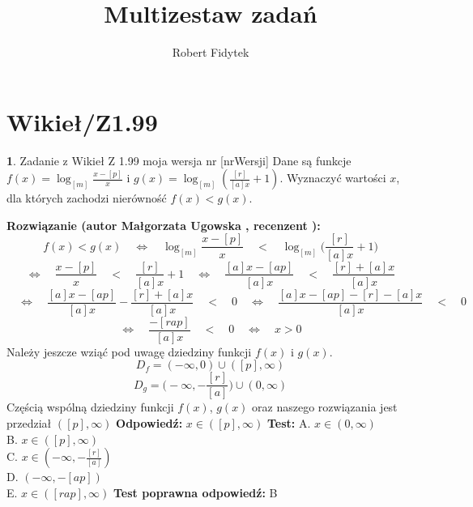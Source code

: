 \documentclass[12pt, a4paper]{article}
\title{Multizestaw zadań}
\author{Robert Fidytek}
\date{}
\theoremstyle{definition} %
\newtheorem{zad}{}
\newcommand{\kategoria}[1]{\section{#1}} %
\newcommand{\zadStart}[1]{\begin{zad}#1\newline} %
\newcommand{\zadStop}{\end{zad}}   %
\newcommand{\rozwStart}[2]{\noindent \textbf{Rozwiązanie (autor #1 , recenzent #2): }\newline} %
\newcommand{\rozwStop}{\newline}                                            %
\newcommand{\odpStart}{\noindent \textbf{Odpowiedź:}\newline}    %
\newcommand{\odpStop}{\newline}                                             %
\newcommand{\testStart}{\noindent \textbf{Test:}\newline} %
\newcommand{\testStop}{\newline} %
\newcommand{\kluczStart}{\noindent \textbf{Test poprawna odpowiedź:}\newline} %
\newcommand{\kluczStop}{\newline} %
\begin{document}
\maketitle


\kategoria{Wikieł/Z1.99}
\zadStart{Zadanie z Wikieł Z 1.99 moja wersja nr [nrWersji]}
Dane są funkcje $f(x) = \log_{[m]}{\frac{x-[p]}{x}}$ i $g(x)= \log_{[m]}{(\frac{[r]}{[a] x}+1)}$. Wyznaczyć warto\'sci $x$, dla których zachodzi nierówno\'sć $f(x)<g(x).$
\zadStop
\rozwStart{Małgorzata Ugowska}{}
$$f(x)<g(x) \quad \Longleftrightarrow \quad \log_{[m]}{\frac{x-[p]}{x}} \quad < \quad \log_{[m]}{\Big(\frac{[r]}{[a] x}+1\Big)}$$
$$ \Longleftrightarrow \quad \frac{x-[p]}{x} \quad < \quad \frac{[r]}{[a] x}+1 \quad \Longleftrightarrow \quad  \frac{[a]x-[ap]}{[a]x} \quad < \quad \frac{[r]+[a]x}{[a] x} $$
$$\quad \Longleftrightarrow \quad  \frac{[a]x-[ap]}{[a]x} - \frac{[r]+[a]x}{[a] x} \quad < \quad 0 \quad \Longleftrightarrow \quad  \frac{[a]x-[ap]-[r]-[a]x}{[a] x} \quad < \quad 0 $$
$$ \Longleftrightarrow \quad \frac{-[rap]}{[a] x} \quad < \quad 0 \quad \Longleftrightarrow \quad x>0$$
Należy jeszcze wziąć pod uwagę dziedziny funkcji $f(x)$ i $g(x)$.
$$D_{f} = (-\infty,0) \cup ([p], \infty)$$
$$D_{g} =\Big(-\infty,-\frac{[r]}{[a]}\Big) \cup (0,\infty)$$
Czę\'scią wspólną dziedziny funkcji $f(x)$, $g(x)$ oraz naszego rozwiązania jest przedział $([p], \infty)$
\rozwStop
\odpStart
$x \in ([p], \infty)$
\odpStop
\testStart
A. $x \in (0, \infty)$\\
B. $x \in ([p], \infty)$\\
C. $x \in (-\infty,-\frac{[r]}{[a]})$\\
D. $(-\infty,-[ap])$\\
E. $x \in ([rap], \infty)$
\testStop
\kluczStart
B
\kluczStop
\end{document}
